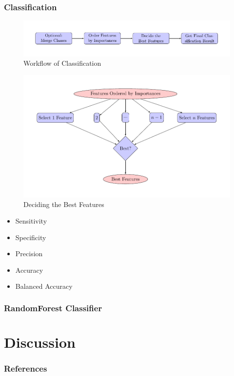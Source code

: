 \documentclass{beamer}
\begin{document}
    \begin{frame}[allowframebreaks]
        \frametitle{Classification}

        \begin{figure}
            \includegraphics[width=0.8 \linewidth]{figures/Classifier/classifier.pdf}
            \caption{Workflow of Classification}
        \end{figure}

        \begin{figure}
            \includegraphics[width=0.8 \linewidth]{figures/Classifier/best.pdf}
            \caption{Deciding the Best Features}
        \end{figure}

        \begin{itemize}
            \item Sensitivity
            \item Specificity
            \item Precision
            \item Accuracy
            \item Balanced Accuracy
        \end{itemize}
    \end{frame}

    \begin{frame}[allowframebreaks]
        \frametitle{RandomForest Classifier}
    \end{frame}

    \section{Discussion}

    \begin{frame}[allowframebreaks]
        \frametitle{References}
        
        
    \end{frame}
\end{document}
